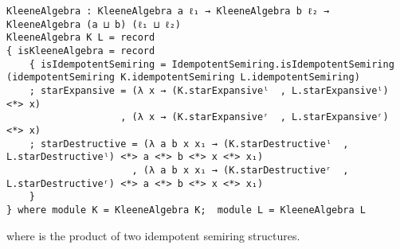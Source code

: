 \begin{verbatim}
KleeneAlgebra : KleeneAlgebra a ℓ₁ → KleeneAlgebra b ℓ₂ → KleeneAlgebra (a ⊔ b) (ℓ₁ ⊔ ℓ₂)
KleeneAlgebra K L = record
{ isKleeneAlgebra = record
    { isIdempotentSemiring = IdempotentSemiring.isIdempotentSemiring (idempotentSemiring K.idempotentSemiring L.idempotentSemiring)
    ; starExpansive = (λ x → (K.starExpansiveˡ  , L.starExpansiveˡ) <*> x)
                    , (λ x → (K.starExpansiveʳ  , L.starExpansiveʳ) <*> x)
    ; starDestructive = (λ a b x x₁ → (K.starDestructiveˡ  , L.starDestructiveˡ) <*> a <*> b <*> x <*> x₁)
                      , (λ a b x x₁ → (K.starDestructiveʳ  , L.starDestructiveʳ) <*> a <*> b <*> x <*> x₁)
    }
} where module K = KleeneAlgebra K;  module L = KleeneAlgebra L
\end{verbatim}

where  is the product of two idempotent semiring structures.
